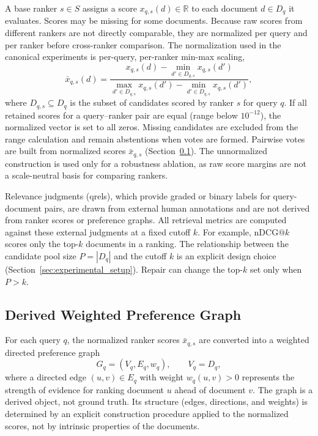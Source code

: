 \documentclass[pdflatex,sn-basic,Numbered]{sn-jnl}
\begin{document}
A base ranker $s \in S$ assigns a score $x_{q,s}(d) \in \mathbb{R}$ to each
document $d \in D_q$ it evaluates. Scores may be missing for some documents.
Because raw scores from different rankers are not directly comparable, they
are normalized per query and per ranker before cross-ranker comparison. The
normalization used in the canonical experiments is per-query, per-ranker
min-max scaling,
\begin{equation}
\bar{x}_{q,s}(d) =
\frac{x_{q,s}(d) - \min_{d' \in D_{q,s}} x_{q,s}(d')}
     {\max_{d' \in D_{q,s}} x_{q,s}(d') - \min_{d' \in D_{q,s}} x_{q,s}(d')},
\label{eq:minmax}
\end{equation}
where $D_{q,s}\subseteq D_q$ is the subset of candidates scored by ranker $s$
for query $q$. If all retained scores for a query--ranker pair are equal
(range below $10^{-12}$), the normalized vector is set to all zeros. Missing
candidates are excluded from the range calculation and remain abstentions
when votes are formed. Pairwise votes are built from normalized scores
$\bar{x}_{q,s}$ (Section~\ref{sec:pref-graph}). The unnormalized construction
is used only for a robustness ablation, as raw score margins are not a
scale-neutral basis for comparing rankers.

Relevance judgments (qrels), which provide graded or binary labels for
query-document pairs, are drawn from external human annotations and are not
derived from ranker scores or preference graphs. All retrieval metrics are
computed against these external judgments at a fixed cutoff $k$. For
example, nDCG$@k$ scores only the top-$k$ documents in a ranking. The
relationship between the candidate pool size $P = |D_q|$ and the cutoff $k$
is an explicit design choice (Section~\ref{sec:experimental_setup}). Repair
can change the top-$k$ set only when $P > k$.

\subsection{Derived Weighted Preference Graph}
\label{sec:pref-graph}

For each query $q$, the normalized ranker scores $\bar{x}_{q,s}$ are
converted into a weighted directed preference graph
\begin{equation}
G_q = (V_q, E_q, w_q), \qquad V_q = D_q,
\label{eq:graph-def}
\end{equation}
where a directed edge $(u,v) \in E_q$ with weight $w_q(u,v) > 0$ represents
the strength of evidence for ranking document $u$ ahead of document $v$. The
graph is a derived object, not ground truth. Its structure (edges,
directions, and weights) is determined by an explicit construction
procedure applied to the normalized scores, not by intrinsic properties of
the documents.
\end{document}
